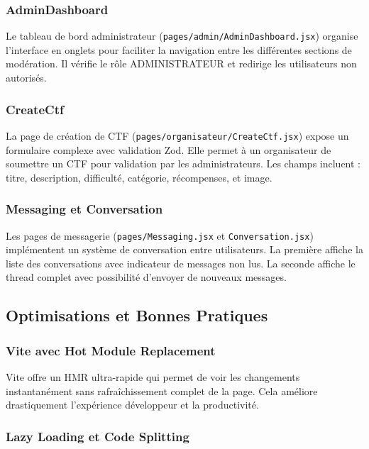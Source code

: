\subsubsection{AdminDashboard}

Le tableau de bord administrateur (\texttt{pages/admin/AdminDashboard.jsx}) organise l'interface en onglets pour faciliter la navigation entre les différentes sections de modération. Il vérifie le rôle ADMINISTRATEUR et redirige les utilisateurs non autorisés.

\subsubsection{CreateCtf}

La page de création de CTF (\texttt{pages/organisateur/CreateCtf.jsx}) expose un formulaire complexe avec validation Zod. Elle permet à un organisateur de soumettre un CTF pour validation par les administrateurs. Les champs incluent : titre, description, difficulté, catégorie, récompenses, et image.

\subsubsection{Messaging et Conversation}

Les pages de messagerie (\texttt{pages/Messaging.jsx} et \texttt{Conversation.jsx}) implémentent un système de conversation entre utilisateurs. La première affiche la liste des conversations avec indicateur de messages non lus. La seconde affiche le thread complet avec possibilité d'envoyer de nouveaux messages.

\subsection{Optimisations et Bonnes Pratiques}

\subsubsection{Vite avec Hot Module Replacement}

Vite offre un HMR ultra-rapide qui permet de voir les changements instantanément sans rafraîchissement complet de la page. Cela améliore drastiquement l'expérience développeur et la productivité.

\subsubsection{Lazy Loading et Code Splitting}

